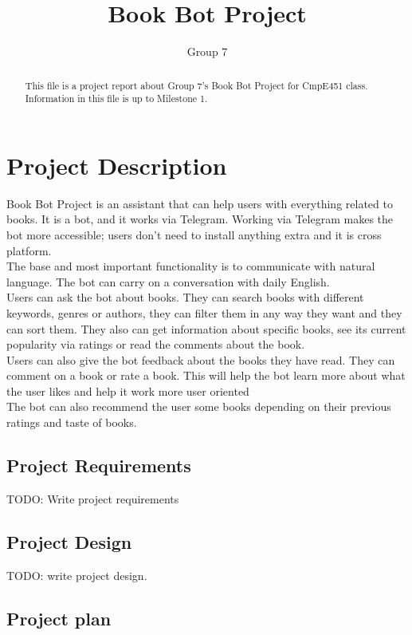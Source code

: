 \documentclass[a4paper]{article}
\title{Book Bot Project}
\author{Group 7}
\begin{document}
\maketitle

\begin{abstract}
This file is a project report about Group 7's Book Bot Project for CmpE451 class. Information in this file is up to Milestone 1.
\end{abstract}

\section{Project Description}

  Book Bot Project is an assistant that can help users with everything related to books. It is a bot, and it works via Telegram. Working via Telegram makes the bot more accessible; users don't need to install anything extra and it is cross platform. \\
  The base and most important functionality is to communicate with natural language. The bot can carry on a conversation with daily English. \\
  Users can ask the bot about books. They can search books with different keywords, genres or authors, they can filter them in any way they want and they can sort them. They also can get information about specific books, see its current popularity via ratings or read the comments about the book.\\
  Users can also give the bot feedback about the books they have read. They can comment on a book or rate a book. This will help the bot learn more about what the user likes and help it work more user oriented \\
  The bot can also recommend the user some books depending on their previous ratings and taste of books.

\subsection{Project Requirements}

TODO: Write project requirements

\subsection{Project Design}

TODO: write project design.

\subsection{Project plan}
\end{document}
